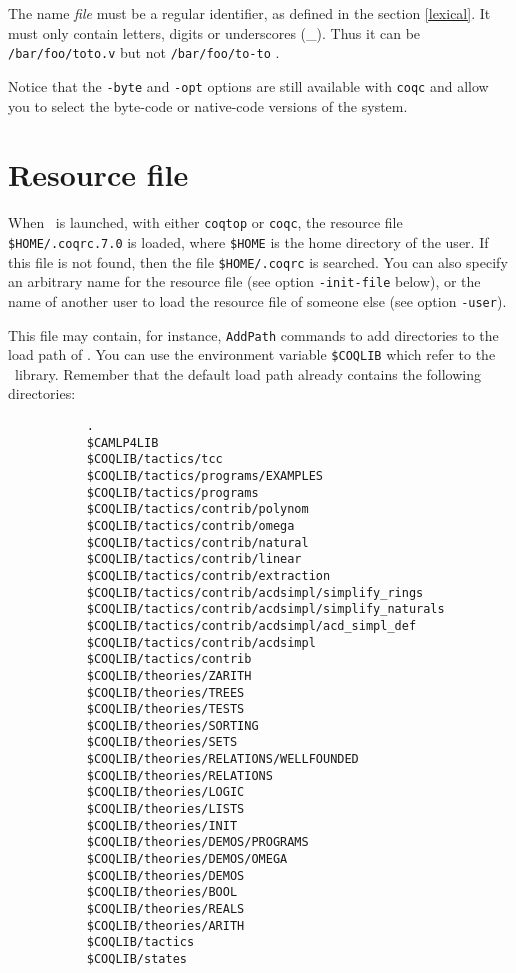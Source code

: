 \Warning The name {\em file} must be a regular {\Coq} identifier, as
defined in the section \ref{lexical}. It
must only contain letters, digits or underscores
(\_). Thus it can be \verb+/bar/foo/toto.v+ but not 
\verb+/bar/foo/to-to+ . 

Notice that the \verb!-byte! and \verb!-opt! options are still
available with \verb!coqc!  and allow you to select the byte-code or
native-code versions of the system.


\section{Resource file}

When \Coq\ is launched, with either {\tt coqtop} or {\tt coqc}, the
resource file \verb:$HOME/.coqrc.7.0: is loaded, where \verb:$HOME: is
the home directory of the user.  If this file is not found, then the
file \verb:$HOME/.coqrc: is searched. You can also specify an
arbitrary name for the resource file (see option \verb:-init-file:
below), or the name of another user to load the resource file of
someone else (see option \verb:-user:).

This file may contain, for instance, \verb:AddPath: commands to add
directories to the load path of \Coq.  You can use the environment
variable \verb:$COQLIB: which refer to the \Coq\
library. Remember that the
default load path already contains the following directories:
\begin{verbatim}
           .
           $CAMLP4LIB
           $COQLIB/tactics/tcc
           $COQLIB/tactics/programs/EXAMPLES
           $COQLIB/tactics/programs
           $COQLIB/tactics/contrib/polynom
           $COQLIB/tactics/contrib/omega
           $COQLIB/tactics/contrib/natural
           $COQLIB/tactics/contrib/linear
           $COQLIB/tactics/contrib/extraction
           $COQLIB/tactics/contrib/acdsimpl/simplify_rings
           $COQLIB/tactics/contrib/acdsimpl/simplify_naturals
           $COQLIB/tactics/contrib/acdsimpl/acd_simpl_def
           $COQLIB/tactics/contrib/acdsimpl
           $COQLIB/tactics/contrib
           $COQLIB/theories/ZARITH
           $COQLIB/theories/TREES
           $COQLIB/theories/TESTS
           $COQLIB/theories/SORTING
           $COQLIB/theories/SETS
           $COQLIB/theories/RELATIONS/WELLFOUNDED
           $COQLIB/theories/RELATIONS
           $COQLIB/theories/LOGIC
           $COQLIB/theories/LISTS
           $COQLIB/theories/INIT
           $COQLIB/theories/DEMOS/PROGRAMS
           $COQLIB/theories/DEMOS/OMEGA
           $COQLIB/theories/DEMOS
           $COQLIB/theories/BOOL
           $COQLIB/theories/REALS
           $COQLIB/theories/ARITH
           $COQLIB/tactics
           $COQLIB/states
\end{verbatim}

